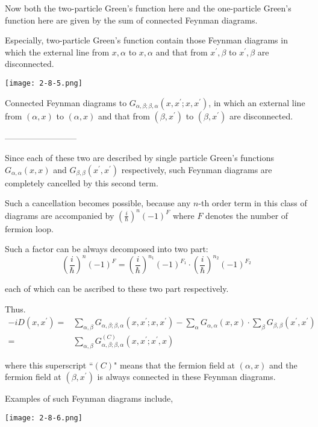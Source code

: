 Now both the two-particle Green's function here and the one-particle Green's function here are given by the sum of connected Feynman diagrams.

Especially, two-particle Green's function contain those Feynman diagrams in which the external line from $x,\alpha$ to $x,\alpha$ and that from $x^{'},\beta$ to $x^{'},\beta$ are disconnected.

\begin{center} \label{Fig2.8.5}
\texttt{[image: 2-8-5.png]}
\end{center}

Connected Feynman diagrams to $G_{\alpha,\beta;\beta,\alpha}(x,x^{'};x,x^{'})$, in which an external line from $(\alpha,x)$ to $(\alpha,x)$ and that from $(\beta,x^{'})$ to $(\beta,x^{'})$ are disconnected.

\begin{center}--------------------------\end{center}

Since each of these two are described by single particle Green's functions $G_{\alpha,\alpha}(x,x)$ and $G_{\beta,\beta}(x^{'},x^{'})$ respectively, such Feynman diagrams are completely cancelled by this second term.

Such a cancellation becomes possible, because any $n$-th order term in this class of diagrams are accompanied by $\left(\frac{i}{\hbar}\right)^n (-1)^F$ where $F$ denotes the number of fermion loop.

Such a factor can be always decomposed into two part:
\[ \left(\frac{i}{\hbar}\right)^n (-1)^F=\left(\frac{i}{\hbar}\right)^{n_1} (-1)^{F_1}\cdot\left(\frac{i}{\hbar}\right)^{n_2} (-1)^{F_2} \]

each of which can be ascribed to these two part respectively.

Thus.
\[\begin{split}
-i D(x,x^{'})=& \sum_{\alpha,\beta} G_{\alpha,\beta;\beta,\alpha}(x,x^{'};x,x^{'}) - \sum_{\alpha}G_{\alpha,\alpha}(x,x)\cdot\sum_{\beta}G_{\beta,\beta}(x^{'},x^{'})\\
=& \sum_{\alpha,\beta}G_{\alpha,\beta;\beta,\alpha}^{(C)}(x,x^{'};x^{'},x)
\end{split}\]

where this superscript ``$(C)$" means that the fermion field at $(\alpha,x)$ and the fermion field at $(\beta,x^{'})$ is always connected in these Feynman diagrams.

Examples of such Feynman diagrams include,
\begin{center} \label{Fig2.8.6}
\texttt{[image: 2-8-6.png]}
\end{center}

